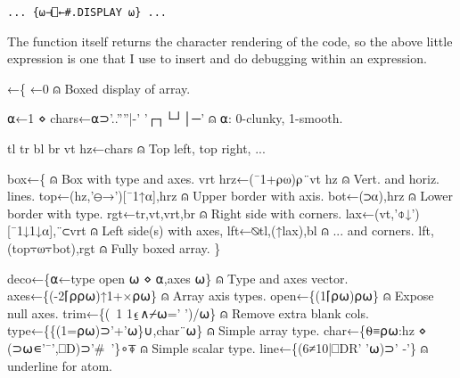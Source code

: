 \documentclass{article}%
\begin{document}
\begin{verbatim}
... {⍵⊣⎕←#.DISPLAY ⍵} ...
\end{verbatim}

\noindent
The function itself returns the character rendering of the code,
so the above little expression is one that I use to insert and do
debugging within an expression.

\nwenddocs{}\endmoddef\nwstartdeflinemarkup\nwenddeflinemarkup
{}←\{ ←0                                                                                      ⍝ Boxed display of array.

        ⍺←1 ⋄ chars←⍺⊃'..''''|-' '┌┐└┘│─'                       ⍝ ⍺: 0-clunky, 1-smooth.

        tl tr bl br vt hz←chars                                                               ⍝ Top left, top right, ...

        box←\{                                                                                                                                 ⍝ Box with type and axes.
                vrt hrz←(¯1+⍴⍵)⍴¨vt hz                                                        ⍝ Vert. and horiz. lines.
                top←(hz,'⊖→')[¯1↑⍺],hrz                                                      ⍝ Upper border with axis.
                bot←(⊃⍺),hrz                                                                                              ⍝ Lower border with type.
                rgt←tr,vt,vrt,br                                                                              ⍝ Right side with corners.
                lax←(vt,'⌽↓')[¯1↓1↓⍺],¨⊂vrt                                     ⍝ Left side(s) with axes,
                lft←⍉tl,(↑lax),bl                                                                         ⍝ ... and corners.
                lft,(top⍪⍵⍪bot),rgt                                                                       ⍝ Fully boxed array.
        \}

        deco←\{⍺←type open ⍵ ⋄ ⍺,axes ⍵\}                           ⍝ Type and axes vector.
        axes←\{(-2⌈⍴⍴⍵)↑1+×⍴⍵\}                                                                  ⍝ Array axis types.
        open←\{(1⌈⍴⍵)⍴⍵\}                                                                                             ⍝ Expose null axes.
        trim←\{(~1 1⍷∧⌿⍵=' ')/⍵\}                                                             ⍝ Remove extra blank cols.
        type←\{\{(1=⍴⍵)⊃'+'⍵\}∪,char¨⍵\}                                     ⍝ Simple array type.
        char←\{⍬≡⍴⍵:hz ⋄ (⊃⍵∊'¯',⎕D)⊃'#~'\}∘⍕          ⍝ Simple scalar type.
        line←\{(6≠10|⎕DR' '⍵)⊃' -'\}                                            ⍝ underline for atom.
\end{document}
